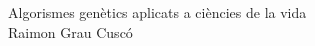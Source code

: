 \documentclass[titlepage,a4paper,12pt]{book}
\begin{document}
\begin{titlepage}
\begin{center}
{\Huge Algorismes genètics aplicats a ciències de la vida}\\[2cm]
{\Large  Raimon Grau Cuscó }\\[5cm]


\end{center}
\end{titlepage}

\newpage{\pagestyle{empty}\cleardoublepage}


\tableofcontents

\newpage{\pagestyle{empty}\cleardoublepage}



%

%
%
%










\end{document}
